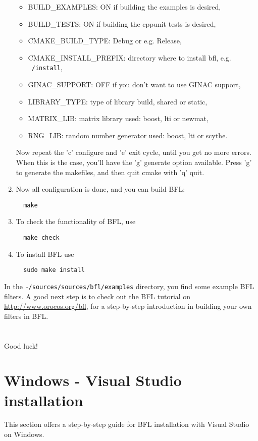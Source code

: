 \documentclass[a4paper,10pt]{article}
\begin{document}
\begin{enumerate}
\begin{itemize}
 \item BUILD\_EXAMPLES: ON if building the examples is desired,
 \item BUILD\_TESTS: ON if building the cppunit tests is desired,
 \item CMAKE\_BUILD\_TYPE: Debug or e.g. Release,
 \item CMAKE\_INSTALL\_PREFIX: directory where to install bfl, e.g. \texttt{~/install}, 
 \item GINAC\_SUPPORT: OFF if you don't want to use GINAC support,
 \item LIBRARY\_TYPE: type of library build, shared or static,
 \item MATRIX\_LIB: matrix library used: boost, lti or newmat,
 \item RNG\_LIB: random number generator used: boost, lti or scythe.
\end{itemize}
Now repeat the 'c' configure and 'e' exit cycle, until you get no more
errors. When this is the case, you'll have the 'g' generate option
available. Press 'g' to generate the makefiles, and then quit cmake
with 'q' quit.
\item Now all configuration is done, and you can build BFL:
\begin{verbatim}
  make 
\end{verbatim}	
\item To check the functionality of BFL, use
\begin{verbatim}
  make check
\end{verbatim}	
\item To install BFL use
\begin{verbatim}
  sudo make install
\end{verbatim}
\end{enumerate}
In the \ $\mathtt{\tilde{ }}$\texttt{/sources/sources/bfl/examples} directory, you find some example BFL
filters. A good next step is to check out the BFL tutorial on
\url{http://www.orocos.org/bfl}, for a step-by-step introduction in building
your own filters in BFL.
\\\\\\
Good luck!



\section{Windows - Visual Studio installation}
\label{sec:windows}
This section offers a step-by-step guide for BFL installation with Visual Studio on Windows.
\end{document}
